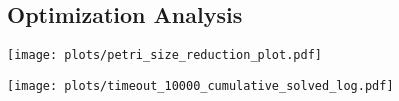 \subsection{Optimization Analysis}







\begin{center}
	\begin{minipage}[t]{0.48\textwidth}
		\centering
		\texttt{[image: plots/petri\_size\_reduction\_plot.pdf]}
		\label{fig:petri_size_reduction}
	\end{minipage}\hfill
	\begin{minipage}[t]{0.48\textwidth}
		\centering
		\texttt{[image: plots/timeout\_10000\_cumulative\_solved\_log.pdf]}
		\label{fig:timeout_cumulative_solved_log}
	\end{minipage}
\end{center}




